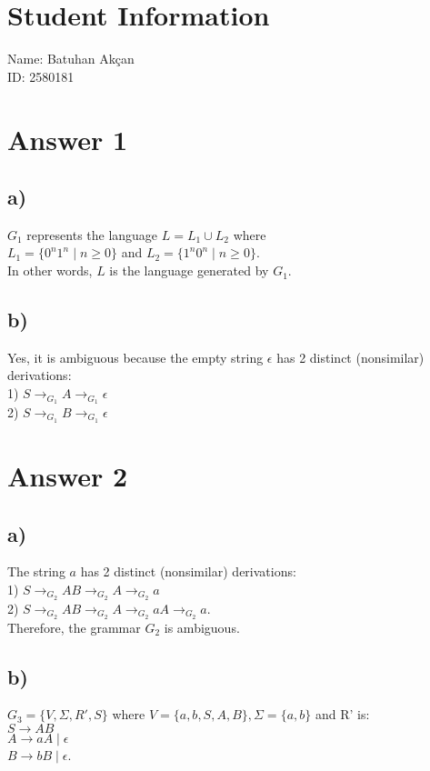 \documentclass{article}
\begin{document}
\section*{Student Information}
Name: Batuhan Akçan \\
ID: 2580181 \\

\section*{Answer 1}
\subsection*{a)}
$G_1$ represents the language $L = L_1 \cup L_2$ where\\
$L_1 = \{0^n1^n \;|\; n \geq 0\}$ and
$L_2 = \{1^n0^n \;|\; n \geq 0\}$.\\
In other words, $L$ is the language generated by $G_1$.
\subsection*{b)}
Yes, it is ambiguous because the empty string $\epsilon$ has 2 distinct (nonsimilar) derivations:\\
1) $S \rightarrow_{G_1} A \rightarrow_{G_1} \epsilon $\\
2) $S \rightarrow_{G_1} B \rightarrow_{G_1} \epsilon$

\section*{Answer 2}
\subsection*{a)}
The string $a$ has 2 distinct (nonsimilar) derivations:\\
1) $S \rightarrow_{G_2} AB \rightarrow_{G_2} A \rightarrow_{G_2} a$\\
2) $S \rightarrow_{G_2} AB \rightarrow_{G_2} A \rightarrow_{G_2} aA \rightarrow_{G_2} a $.\\
Therefore, the grammar $G_2$ is ambiguous.
\subsection*{b)}
$G_3 = \{V, \Sigma, R', S\}$ where $V = \{a,b,S,A,B\}, \Sigma = \{a,b\}$ and R' is:\\
$S \rightarrow AB$\\
$A \rightarrow aA \;|\; \epsilon$\\
$B \rightarrow bB \;|\; \epsilon$.
\end{document}
